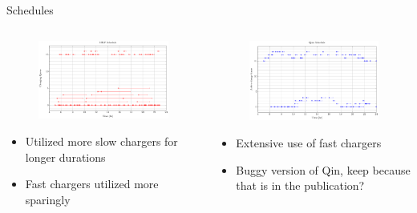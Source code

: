 \documentclass[aspectratio=169]{beamer}
\begin{document}
\begin{frame}[label={sec:org34efd8d}]{Schedules}
\begin{columns}
\begin{column}{0.5\columnwidth}
\begin{figure}[htpb]
\centering
    \includegraphics[width=\textwidth]{img/milp-pap/schedule-milp-pap}
\end{figure}

\begin{itemize}
\item Utilized more slow chargers for longer durations
\item Fast chargers utilized more sparingly
\end{itemize}
\end{column}

\begin{column}{0.5\columnwidth}
\begin{figure}[htpb]
\centering
    \includegraphics[width=\textwidth]{img/milp-pap/schedule-qin}
\end{figure}

\begin{itemize}
\item Extensive use of fast chargers
\item \alert{Buggy version of Qin, keep because that is in the publication?}
\end{itemize}
\end{column}
\end{columns}
\end{frame}
\end{document}
